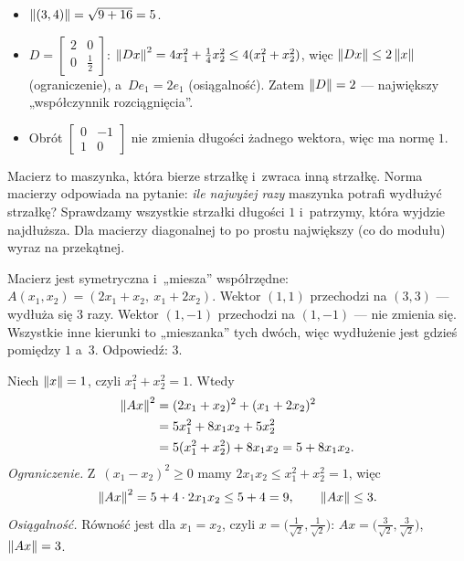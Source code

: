 \documentclass[11pt]{article}
\begin{document}
\begin{przyklad}
\begin{itemize}
\item $\left\lVert (3,4) \right\rVert=\sqrt{9+16}=5$.
\item $D=\left[\begin{smallmatrix}2&0\\0&\frac12\end{smallmatrix}\right]$:
$\left\lVert Dx \right\rVert^2=4x_1^2+\tfrac14x_2^2\le4(x_1^2+x_2^2)$, więc
$\left\lVert Dx \right\rVert\le2\left\lVert x \right\rVert$ (ograniczenie), a~$De_1=2e_1$ (osiągalność).
Zatem $\left\lVert D \right\rVert=2$ --- największy „współczynnik rozciągnięcia”.
\item Obrót $\left[\begin{smallmatrix}0&-1\\1&0\end{smallmatrix}\right]$
nie zmienia długości żadnego wektora, więc ma normę $1$.
\end{itemize}
\end{przyklad}

\begin{poludzku}
Macierz to maszynka, która bierze strzałkę i~zwraca inną strzałkę. Norma
macierzy odpowiada na pytanie: \emph{ile najwyżej razy} maszynka potrafi
wydłużyć strzałkę? Sprawdzamy wszystkie strzałki długości $1$ i~patrzymy,
która wyjdzie najdłuższa. Dla macierzy diagonalnej to po prostu
największy (co do modułu) wyraz na przekątnej.
\end{poludzku}

\begin{intuicja}
Macierz jest symetryczna i~„miesza” współrzędne: $A(x_1,x_2)=(2x_1+x_2,\
x_1+2x_2)$. Wektor $(1,1)$ przechodzi na $(3,3)$ --- wydłuża się $3$ razy.
Wektor $(1,-1)$ przechodzi na $(1,-1)$ --- nie zmienia się. Wszystkie inne
kierunki to „mieszanka” tych dwóch, więc wydłużenie jest gdzieś
pomiędzy $1$ a~$3$. Odpowiedź: $3$.
\end{intuicja}

\formalnie
Niech $\left\lVert x \right\rVert=1$, czyli $x_1^2+x_2^2=1$. Wtedy
\begin{align*}
\left\lVert Ax \right\rVert^2&=(2x_1+x_2)^2+(x_1+2x_2)^2\\
&=5x_1^2+8x_1x_2+5x_2^2\\
&=5(x_1^2+x_2^2)+8x_1x_2=5+8x_1x_2.
\end{align*}
\emph{Ograniczenie.} Z~$(x_1-x_2)^2\ge0$ mamy $2x_1x_2\le x_1^2+x_2^2=1$, więc
\[
\left\lVert Ax \right\rVert^2=5+4\cdot2x_1x_2\le5+4=9,\qquad\left\lVert Ax \right\rVert\le3.
\]
\emph{Osiągalność.} Równość jest dla $x_1=x_2$, czyli
$x=\bigl(\tfrac1{\sqrt2},\tfrac1{\sqrt2}\bigr)$:
$Ax=\bigl(\tfrac3{\sqrt2},\tfrac3{\sqrt2}\bigr)$, $\left\lVert Ax \right\rVert=3$.
\end{document}

